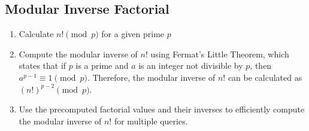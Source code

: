 \subsection{Modular Inverse Factorial}

\begin{enumerate}
    \item Calculate $n! \pmod{p}$ for a given prime $p$
    \item Compute the modular inverse of $n!$ using Fermat's Little Theorem, which states that if $p$ is a prime and $a$ is an integer not divisible by $p$, then $a^{p-1} \equiv 1 \pmod{p}$. Therefore, the modular inverse of $n!$ can be calculated as $(n!)^{p-2} \pmod{p}$.
    \item Use the precomputed factorial values and their inverses to efficiently compute the modular inverse of $n!$ for multiple queries.
\end{enumerate}